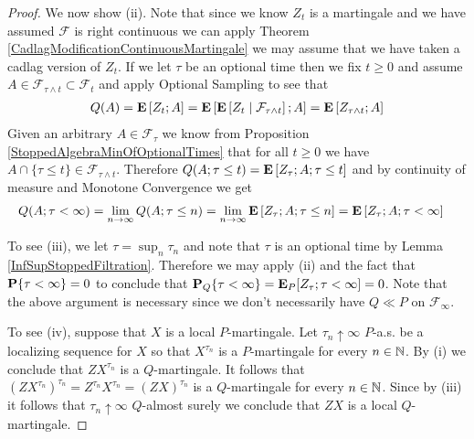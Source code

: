 \begin{proof}
We now show (ii).  Note that since we know $Z_t$ is a martingale and we have assumed $\mathcal{F}$ is right continuous we can apply Theorem \ref{CadlagModificationContinuousMartingale} we may assume that we have taken a cadlag version of $Z_t$.  If we let $\tau$ be an optional time then we fix $t \geq 0$ and assume $A \in \mathcal{F}_{\tau \wedge t} \subset \mathcal{F}_t$ and apply Optional Sampling to see that 
\begin{align*}
Q(A) = \expectation{Z_t ; A} = \expectation{\cexpectationlong{\mathcal{F}_{\tau\wedge t}}{Z_t} ; A} =  \expectation{Z_{\tau \wedge t}; A} 
\end{align*}
Given an arbitrary $A \in \mathcal{F}_\tau$ we know from Proposition \ref{StoppedAlgebraMinOfOptionalTimes} that for all $t \geq 0$ we have $A \cap \lbrace \tau \leq t \rbrace \in \mathcal{F}_{\tau \wedge t}$.  Therefore $Q(A ; \tau \leq t) = \expectation{Z_{\tau}; A; \tau \leq t}$ and by continuity of measure and Monotone Convergence we get 
\begin{align*}
Q(A ; \tau < \infty) &= \lim_{n \to \infty} Q(A ; \tau \leq n) = \lim_{n \to \infty} \expectation{Z_{\tau}; A; \tau \leq n}= \expectation{Z_{\tau}; A; \tau < \infty}
\end{align*}

To see (iii), we let $\tau = \sup_n \tau_n$ and note that $\tau$ is an optional time by Lemma \ref{InfSupStoppedFiltration}.  Therefore we may apply (ii) and the fact that $\probability{\tau < \infty} = 0$ to conclude that $\sprobability{\tau < \infty}{Q} = \sexpectation{Z_\tau ; \tau < \infty}{P} = 0$.  Note that the above argument is necessary since we don't necessarily have $Q \ll P$ on $\mathcal{F}_\infty$.

To see (iv), suppose that $X$ is a local $P$-martingale.  Let $\tau_n \uparrow \infty$ $P$-a.s. be a localizing sequence for $X$ so that $X^{\tau_n}$ is a $P$-martingale for every $n \in \naturals$.  By (i) we conclude that $Z X^{\tau_n}$ is a $Q$-martingale.  It follows that $(Z X^{\tau_n})^{\tau_n} = Z^{\tau_n} X^{\tau_n} = (Z X)^{\tau_n}$ is a $Q$-martingale for every $n \in \naturals$.  Since by (iii) it follows that $\tau_n \uparrow \infty$ $Q$-almost surely we conclude that $ZX$ is a local $Q$-martingale.  


\end{proof}
